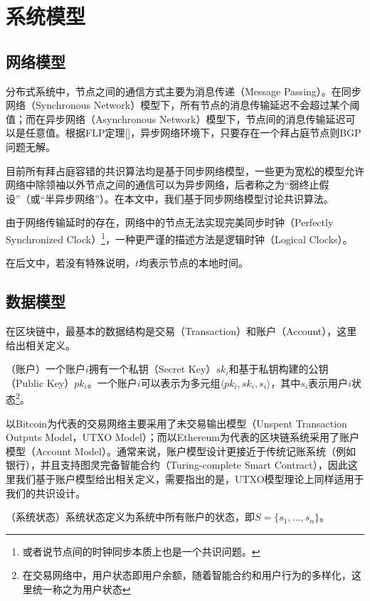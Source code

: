 \section{系统模型}
\subsection{网络模型}
分布式系统中，节点之间的通信方式主要为消息传递（Message Passing）。在同步网络（Synchronous Network）模型下，所有节点的消息传输延迟不会超过某个阈值；而在异步网络（Asynchronous Network）模型下，节点间的消息传输延迟可以是任意值。根据FLP定理[]，异步网络环境下，只要存在一个拜占庭节点则BGP问题无解。

目前所有拜占庭容错的共识算法均是基于同步网络模型，一些更为宽松的模型允许网络中除领袖以外节点之间的通信可以为异步网络，后者称之为“弱终止假设”（或“半异步网络”）\cite{castro1999practical}。在本文中，我们基于同步网络模型讨论共识算法。

由于网络传输延时的存在，网络中的节点无法实现完美同步时钟（Perfectly Synchronized Clock）\footnote{或者说节点间的时钟同步本质上也是一个共识问题。}，一种更严谨的描述方法是逻辑时钟（Logical Clocks）\cite{lamport1978time}。

在后文中，若没有特殊说明，$t$均表示节点的本地时间。

\subsection{数据模型}
在区块链中，最基本的数据结构是交易（Transaction）和账户（Account），这里给出相关定义。

\begin{definition}
（账户）一个账户$i$拥有一个私钥（Secret Key）$sk_i$和基于私钥构建的公钥（Public Key）$pk_i$。一个账户$i$可以表示为多元组$\langle pk_i,sk_i,s_i\rangle$，其中$s_i$表示用户$i$状态\footnote{在交易网络中，用户状态即用户余额，随着智能合约和用户行为的多样化，这里统一称之为用户状态}。
\end{definition}

以Bitcoin为代表的交易网络主要采用了未交易输出模型（Unspent Transaction Outputs Model，UTXO Model）；而以Ethereum为代表的区块链系统采用了账户模型（Account Model）。通常来说，账户模型设计更接近于传统记账系统（例如银行），并且支持图灵完备智能合约（Turing-complete Smart Contract），因此这里我们基于账户模型给出相关定义，需要指出的是，UTXO模型理论上同样适用于我们的共识设计。

\begin{definition}
（系统状态）系统状态定义为系统中所有账户的状态，即$S=\{s_1,...,s_n\}$。
\end{definition}

